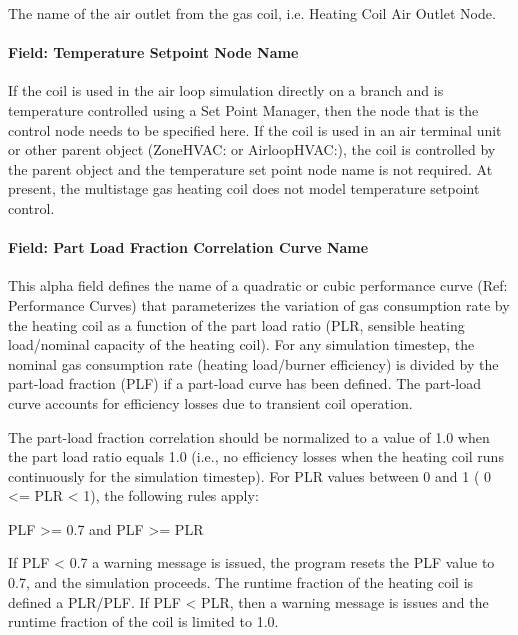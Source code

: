 The name of the air outlet from the gas coil, i.e. Heating Coil Air Outlet Node.

\paragraph{Field: Temperature Setpoint Node Name}\label{field-temperature-setpoint-node-name-5}

If the coil is used in the air loop simulation directly on a branch and is temperature controlled using a Set Point Manager, then the node that is the control node needs to be specified here. If the coil is used in an air terminal unit or other parent object (ZoneHVAC: or AirloopHVAC:), the coil is controlled by the parent object and the temperature set point node name is not required. At present, the multistage gas heating coil does not model temperature setpoint control.

\paragraph{Field: Part Load Fraction Correlation Curve Name}\label{field-part-load-fraction-correlation-curve-name-1}

This alpha field defines the name of a quadratic or cubic performance curve (Ref: Performance Curves) that parameterizes the variation of gas consumption rate by the heating coil as a function of the part load ratio (PLR, sensible heating load/nominal capacity of the heating coil). For any simulation timestep, the nominal gas consumption rate (heating load/burner efficiency) is divided by the part-load fraction (PLF) if a part-load curve has been defined. The part-load curve accounts for efficiency losses due to transient coil operation.

The part-load fraction correlation should be normalized to a value of 1.0 when the part load ratio equals 1.0 (i.e., no efficiency losses when the heating coil runs continuously for the simulation timestep). For PLR values between 0 and 1 ( 0 \textless{}= PLR \textless{} 1), the following rules apply:

PLF \textgreater{}= 0.7 and PLF \textgreater{}= PLR

If PLF \textless{} 0.7 a warning message is issued, the program resets the PLF value to 0.7, and the simulation proceeds. The runtime fraction of the heating coil is defined a PLR/PLF. If PLF \textless{} PLR, then a warning message is issues and the runtime fraction of the coil is limited to 1.0.

